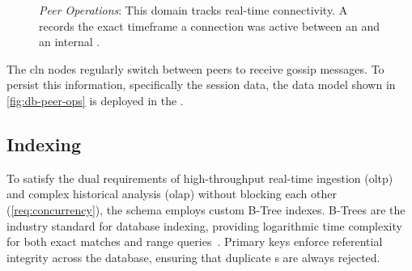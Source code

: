 \begin{figure}[H]
    \caption{
        \textit{Peer Operations}: This domain tracks real-time connectivity. 
        A  records the exact timeframe a connection was 
        active between an  and an internal .
    }
    \label{fig:db-peer-ops}
\end{figure}

The \gls{cln} nodes regularly switch between peers to receive gossip messages.
To persist this information, specifically the session data, the data model shown in
\autoref{fig:db-peer-ops} is deployed in the .



\subsection{Indexing}
To satisfy the dual requirements of high-throughput real-time ingestion (\gls{oltp}) 
and complex historical analysis (\gls{olap}) without blocking each other (\ref{req:concurrency}), 
the schema employs custom B-Tree indexes.
B-Trees are the industry standard for database indexing, providing logarithmic time complexity 
for both exact matches and range queries~\cite[Chapter~14]{garcia-molina_database_2009}.
Primary keys enforce referential integrity across the database, ensuring that duplicate s are always rejected.

